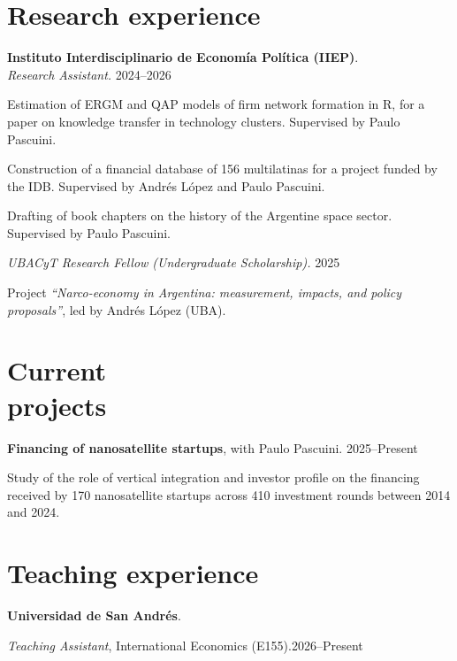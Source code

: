 \documentclass[11pt]{article}
\newcommand{\entrydate}[1]{\hfill{\small{#1}}}
\begin{document}
\section{Research experience}
\textbf{Instituto Interdisciplinario de Economía Política (IIEP)}.
\\
\textit{Research Assistant.} \entrydate{2024--2026}
\begin{cvitems}
    \item Estimation of ERGM and QAP models of firm network formation in R, for a paper on knowledge transfer in technology clusters. Supervised by Paulo Pascuini.
    \item Construction of a financial database of 156 multilatinas for a project funded by the IDB. Supervised by Andrés López and Paulo Pascuini.
    \item Drafting of book chapters on the history of the Argentine space sector. Supervised by Paulo Pascuini.
\end{cvitems}
\vspace{5pt}
\textit{UBACyT Research Fellow (Undergraduate Scholarship).} \entrydate{2025}
\begin{cvitems}
    \item Project \emph{``Narco-economy in Argentina: measurement, impacts, and policy proposals''}, led by Andrés López (UBA).
\end{cvitems}

\section{Current\\projects}
\textbf{Financing of nanosatellite startups}, with Paulo Pascuini. \entrydate{2025--Present}
\begin{cvitems}
  \item Study of the role of vertical integration and investor profile on the financing received by 170 nanosatellite startups across 410 investment rounds between 2014 and 2024.
\end{cvitems}

\section{Teaching experience}
\textbf{Universidad de San Andrés}.
\begin{cvitems}
  \item \textit{Teaching Assistant}, International Economics (E155).\entrydate{2026--Present}
\end{cvitems}
\end{document}

